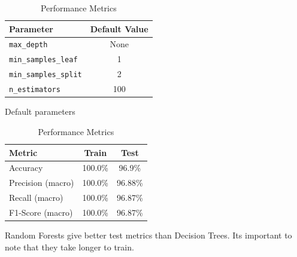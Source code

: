 \begin{table}[h!]
  \begin{minipage}{.5\linewidth}
    \centering
    \begin{tabular}{|l|c|}
      \hline
      \textbf{Parameter} & \textbf{Default Value} \\
      \hline
      \texttt{max\_depth} & None \\
      \texttt{min\_samples\_leaf} & 1 \\
      \texttt{min\_samples\_split} & 2 \\
      \texttt{n\_estimators} & 100 \\
      \hline
    \end{tabular}
    \caption{Default parameters}
  \end{minipage}%
  \begin{minipage}{.5\linewidth}
    \centering
    \begin{tabular}{|l|c|c|}
      \hline
      \textbf{Metric} & \textbf{Train} & \textbf{Test} \\
      \hline
      Accuracy & 100.0\% & 96.9\% \\
      Precision (macro) & 100.0\% & 96.88\% \\
      Recall (macro) & 100.0\% & 96.87\% \\
      F1-Score (macro) & 100.0\% & 96.87\% \\
      \hline
    \end{tabular}
    \caption{Performance Metrics}
  \end{minipage}
\end{table}


Random Forests give better test metrics than Decision Trees. Its important to note that they take longer to train.

